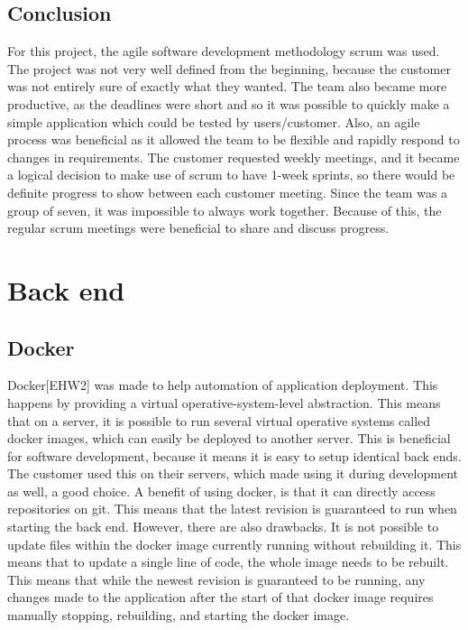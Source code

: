 \subsection{Conclusion}
For this project, the agile software development methodology scrum was used. The project was not very well defined from the beginning, because the customer was not entirely sure of exactly what they wanted. The team also became more productive, as the deadlines were short and so it was possible to quickly make a simple application which could be tested by users/customer. Also, an agile process was beneficial as it allowed the team to be flexible and rapidly respond to changes in requirements. The customer requested weekly meetings, and it became a logical decision to make use of scrum to have 1-week  sprints, so there would be definite progress to show between each customer meeting. Since the team was a group of seven, it was impossible to always work together. Because of this, the regular scrum meetings were beneficial to share and discuss progress.

\section{Back end}

\subsection{Docker}
\label{subsec:docker}

Docker[EHW2] was made to help automation of application deployment. This happens by providing a virtual operative-system-level abstraction. This means that on a server, it is possible to run several virtual operative systems called docker images, which can easily be deployed to another server. This is beneficial for software development, because it means it is easy to setup identical back ends. The customer used this on their servers, which made using it during development as well, a good choice. A benefit of using docker, is that it can directly access repositories on git. This means that the latest revision is guaranteed to run when starting the back end. However, there are also drawbacks. It is not possible to update files within the docker image currently running without rebuilding it. This means that to update a single line of code, the whole image needs to be rebuilt. This means that while the newest revision is guaranteed to be running, any changes made to the application after the start of that docker image requires manually stopping, rebuilding, and starting the docker image.

